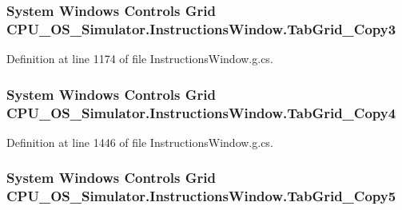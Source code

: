 \subsubsection[{Tab\+Grid\+\_\+\+Copy3}]{\setlength{\rightskip}{0pt plus 5cm}System Windows Controls Grid C\+P\+U\+\_\+\+O\+S\+\_\+\+Simulator.\+Instructions\+Window.\+Tab\+Grid\+\_\+\+Copy3\hspace{0.3cm}{\ttfamily [package]}}\label{class_c_p_u___o_s___simulator_1_1_instructions_window_a8a50487f6e6acca8a58ffe218e32abe2}


Definition at line 1174 of file Instructions\+Window.\+g.\+cs.

\hypertarget{class_c_p_u___o_s___simulator_1_1_instructions_window_a33c64471b02aed8597462149051c2b51}{}
\subsubsection[{Tab\+Grid\+\_\+\+Copy4}]{\setlength{\rightskip}{0pt plus 5cm}System Windows Controls Grid C\+P\+U\+\_\+\+O\+S\+\_\+\+Simulator.\+Instructions\+Window.\+Tab\+Grid\+\_\+\+Copy4\hspace{0.3cm}{\ttfamily [package]}}\label{class_c_p_u___o_s___simulator_1_1_instructions_window_a33c64471b02aed8597462149051c2b51}


Definition at line 1446 of file Instructions\+Window.\+g.\+cs.

\hypertarget{class_c_p_u___o_s___simulator_1_1_instructions_window_a495a21e0e96f26f87d3e379ab286256b}{}
\subsubsection[{Tab\+Grid\+\_\+\+Copy5}]{\setlength{\rightskip}{0pt plus 5cm}System Windows Controls Grid C\+P\+U\+\_\+\+O\+S\+\_\+\+Simulator.\+Instructions\+Window.\+Tab\+Grid\+\_\+\+Copy5\hspace{0.3cm}{\ttfamily [package]}}\label{class_c_p_u___o_s___simulator_1_1_instructions_window_a495a21e0e96f26f87d3e379ab286256b}


